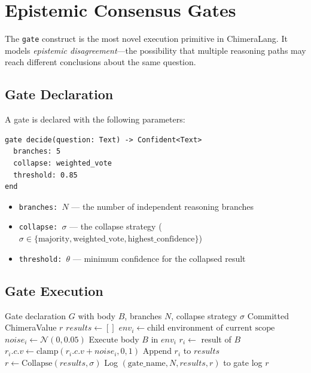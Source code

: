 \documentclass[11pt,a4paper]{article}
\begin{document}
\section{Epistemic Consensus Gates}
\label{sec:gates}

The \texttt{gate} construct is the most novel execution primitive in
ChimeraLang. It models \emph{epistemic disagreement}---the possibility that
multiple reasoning paths may reach different conclusions about the same question.

\subsection{Gate Declaration}

A gate is declared with the following parameters:

\begin{lstlisting}[caption={Gate declaration syntax.}]
gate decide(question: Text) -> Confident<Text>
  branches: 5
  collapse: weighted_vote
  threshold: 0.85
end
\end{lstlisting}

\begin{itemize}[leftmargin=2em]
  \item \texttt{branches: $N$} --- the number of independent reasoning branches
  \item \texttt{collapse: $\sigma$} --- the collapse strategy
    ($\sigma \in \{\text{majority}, \text{weighted\_vote},
    \text{highest\_confidence}\}$)
  \item \texttt{threshold: $\theta$} --- minimum confidence for the collapsed result
\end{itemize}

\subsection{Gate Execution}

\begin{algorithm}[H]
\caption{Gate execution with noise injection.}
\label{alg:gate}
\begin{algorithmic}[1]
\Require Gate declaration $G$ with body $B$, branches $N$, collapse strategy $\sigma$
\Ensure Committed ChimeraValue $r$
\State $\mathit{results} \gets []$
  \State $\mathit{env}_i \gets \text{child environment of current scope}$
  \State $\mathit{noise}_i \gets \mathcal{N}(0, 0.05)$ 
  \State Execute body $B$ in $\mathit{env}_i$
  \State $r_i \gets$ result of $B$
  \State $r_i.c.v \gets \text{clamp}(r_i.c.v + \mathit{noise}_i, 0, 1)$
  \State Append $r_i$ to $\mathit{results}$
\EndFor
\State $r \gets \text{Collapse}(\mathit{results}, \sigma)$
\State Log $(\text{gate\_name}, N, \mathit{results}, r)$ to gate log
\State \Return $r$
\end{algorithmic}
\end{algorithm}
\end{document}
